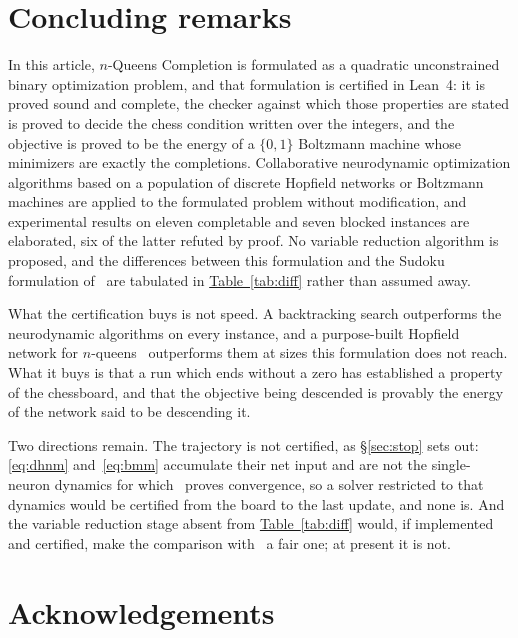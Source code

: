\documentclass{easychair}
\newcommand{\secref}[1]{\hyperref[#1]{\textcolor{academicpurple}{\S\ref*{#1}}}}
\newcommand{\citeref}[1]{\textcolor{academicpurple}{\cite{#1}}}
\newcommand{\tabref}[1]{\textcolor{academicpurple}{\hyperref[#1]{Table~\ref*{#1}}}}
\begin{document}
\section{Concluding remarks}\label{sec:concl}

In this article, $n$-Queens Completion is formulated as a quadratic unconstrained binary
optimization problem, and that formulation is certified in Lean~4: it is proved sound and complete,
the checker against which those properties are stated is proved to decide the chess condition
written over the integers, and the objective is proved to be the energy of a $\{0,1\}$ Boltzmann
machine whose minimizers are exactly the completions. Collaborative neurodynamic optimization
algorithms based on a population of discrete Hopfield networks or Boltzmann machines are applied to
the formulated problem without modification, and experimental results on eleven completable and
seven blocked instances are elaborated, six of the latter refuted by proof. No variable reduction
algorithm is proposed, and the differences between this formulation and the Sudoku formulation
of~\citeref{liwang2022} are tabulated in \tabref{tab:diff} rather than assumed away.

What the certification buys is not speed. A backtracking search outperforms the neurodynamic
algorithms on every instance, and a purpose-built Hopfield network for
$n$-queens~\citeref{mandziuk1995} outperforms them at sizes this formulation does not reach. What it
buys is that a run which ends without a zero has established a property of the chessboard, and that
the objective being descended is provably the energy of the network said to be descending it.

Two directions remain. The trajectory is not certified, as \secref{sec:stop} sets out:
\eqref{eq:dhnm} and~\eqref{eq:bmm} accumulate their net input and are not the single-neuron dynamics
for which~\citeref{hnbm} proves convergence, so a solver restricted to that dynamics would be
certified from the board to the last update, and none is. And the variable reduction stage absent
from \tabref{tab:diff} would, if implemented and certified, make the comparison
with~\citeref{liwang2022} a fair one; at present it is not.

\section*{Acknowledgements}
\end{document}
